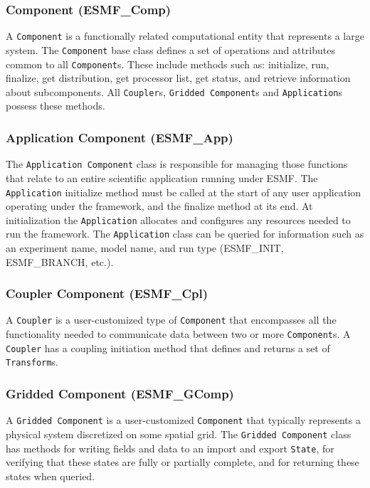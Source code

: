 \subsubsection{Component (ESMF\_Comp)} 
A {\tt Component} is a functionally related computational entity that 
represents a large system.  The {\tt Component} base class defines a set of operations and
attributes common to all {\tt Component}s.  These include methods such as:
initialize, run, finalize, get distribution, get processor list, get status, 
and retrieve information about subcomponents.  
All {\tt Coupler}s, {\tt Gridded Component}s and {\tt Application}s possess 
these methods. 

\subsubsection{Application Component (ESMF\_App)}

The {\tt Application Component} class is responsible for managing those 
functions that relate to an entire scientific application running under ESMF.
The {\tt Application} initialize method 
must be called at the start of any user application operating under the framework, and
the finalize method at its end.  At initialization the {\tt Application} allocates and 
configures any resources needed to run the framework.  The {\tt Application}
class can be queried for information such as an experiment name, model name, and run 
type (ESMF\_INIT, ESMF\_BRANCH, etc.).  

\subsubsection{Coupler Component (ESMF\_Cpl)}
A {\tt Coupler} is a user-customized type of {\tt Component} that 
encompasses all the functionality needed to communicate data between two or 
more {\tt Component}s.  A {\tt Coupler} has a coupling initiation method that 
defines and returns a set of {\tt Transform}s.

\subsubsection{Gridded Component (ESMF\_GComp)}
\label{sec:griddedcomponent} 
A {\tt Gridded Component} is a user-customized {\tt Component} 
that typically represents a physical system discretized on some spatial grid.
The {\tt Gridded Component} class has methods for writing 
fields and data to an import and export {\tt State}, for verifying that
these states are fully or partially complete, and for returning these
states when queried.

